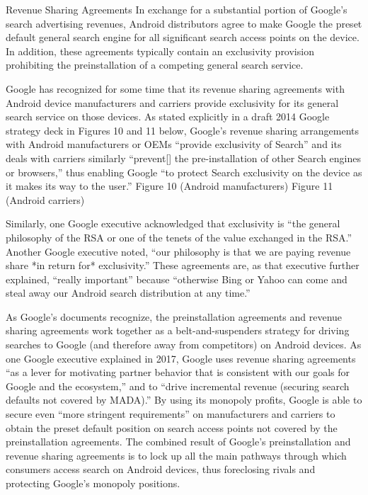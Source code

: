 \documentclass[11pt,b5paper]{scrartcl}
\begin{document}

Revenue Sharing Agreements
In exchange for a substantial portion of Google’s search advertising revenues,
Android distributors agree to make Google the preset default general search engine for all
significant search access points on the device. In addition, these agreements typically contain an
exclusivity provision prohibiting the preinstallation of a competing general search service.


Google has recognized for some time that its revenue sharing agreements with
Android device manufacturers and carriers provide exclusivity for its general search service on
those devices. As stated explicitly in a draft 2014 Google strategy deck in Figures 10 and 11
below, Google’s revenue sharing arrangements with Android manufacturers or OEMs “provide
exclusivity of Search” and its deals with carriers similarly “prevent[] the pre-installation of other
Search engines or browsers,” thus enabling Google “to protect Search exclusivity on the device
as it makes its way to the user.”
Figure 10 (Android manufacturers)
Figure 11 (Android carriers)


Similarly, one Google executive acknowledged that exclusivity is “the general
philosophy of the RSA or one of the tenets of the value exchanged in the RSA.” Another Google
executive noted, “our philosophy is that we are paying revenue share *in return for* exclusivity.”
These agreements are, as that executive further explained, “really important” because “otherwise
Bing or Yahoo can come and steal away our Android search distribution at any time.”


As Google’s documents recognize, the preinstallation agreements and revenue
sharing agreements work together as a belt-and-suspenders strategy for driving searches to
Google (and therefore away from competitors) on Android devices. As one Google executive
explained in 2017, Google uses revenue sharing agreements “as a lever for motivating partner
behavior that is consistent with our goals for Google and the ecosystem,” and to “drive
incremental revenue (securing search defaults not covered by MADA).” By using its monopoly
profits, Google is able to secure even “more stringent requirements” on manufacturers and
carriers to obtain the preset default position on search access points not covered by the
preinstallation agreements. The combined result of Google’s preinstallation and revenue sharing
agreements is to lock up all the main pathways through which consumers access search on
Android devices, thus foreclosing rivals and protecting Google’s monopoly positions.
\end{document}
